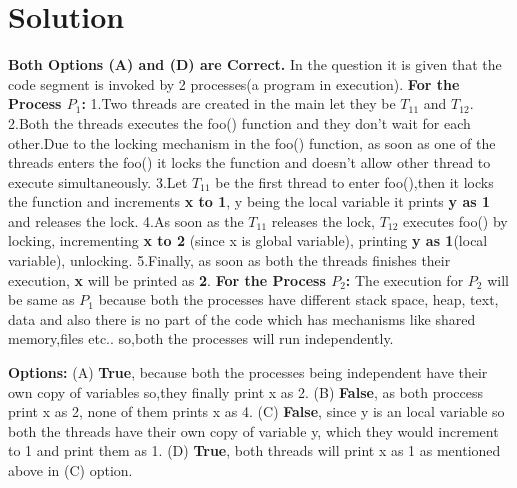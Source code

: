 \documentclass[journal,12pt,twocolumn]{IEEEtran}
\begin{document}
\section{Solution}
\textbf{Both Options (A) and (D) are Correct.}
\newline
In the question it is given that the code segment is invoked by 2 processes(a program in execution).
\newline
\textbf{For the Process $P_{1}$:}
\newline
1.Two threads are created in the main let they be $T_{11}$ and $T_{12}$.
\newline
2.Both the threads executes the foo() function and they don't wait for each other.Due to the locking mechanism in the foo() function, as soon as one of the threads enters the foo() it locks the function and doesn't allow other thread to execute simultaneously.
\newline
3.Let $T_{11}$ be the first thread to enter foo(),then it locks the function and increments \textbf{x to 1}, y being the local variable it prints \textbf{y as 1} and releases the lock.
\newline
4.As soon as the $T_{11}$ releases the lock, $T_{12}$ executes foo() by locking, incrementing \textbf{x to 2} (since x is global variable), printing  \textbf{y as 1}(local variable), unlocking.
\newline
5.Finally, as soon as both the threads finishes their execution, \textbf{x} will be printed as \textbf{2}.
\newline
\textbf{For the Process $P_{2}$:}
\newline
The execution for $P_{2}$ will be same as $P_{1}$ because both the processes have different stack space, heap, text, data and also there is no part of the code which has mechanisms like shared memory,files etc.. so,both the processes will run independently.
 
\newline

\textbf{Options:}
\newline
(A) \textbf{True}, because both the processes being independent have their own copy of variables so,they finally print x as 2.
\newline
(B) \textbf{False}, as both proccess print x as 2, none of them prints x as 4.
\newline
(C) \textbf{False}, since y is an local variable so both the threads have their own copy of variable y, which they would increment to 1 and print them as 1.
\newline
(D) \textbf{True}, both threads will print x as 1 as mentioned above in (C) option.
\end{document}
